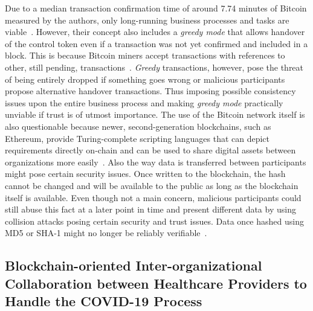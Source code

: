 Due to a median transaction confirmation time of around 7.74 minutes of Bitcoin measured by the authors, only long-running business processes and tasks are viable~\cite{runtime_verification_for_bp_utilizing_bitcoin}. However, their concept also includes a \textit{greedy mode} that allows handover of the control token even if a transaction was not yet confirmed and included in a block. This is because Bitcoin miners accept transactions with references to other, still pending, transactions~\cite{nakamoto2009}. \textit{Greedy} transactions, however, pose the threat of being entirely dropped if something goes wrong or malicious participants propose alternative handover transactions. Thus imposing possible consistency issues upon the entire business process and making \textit{greedy mode} practically unviable if trust is of utmost importance. The use of the Bitcoin network itself is also questionable because newer, second-generation blockchains, such as Ethereum, provide Turing-complete scripting languages that can depict requirements directly on-chain and can be used to share digital assets between organizations more easily~\cite{bo_collaboration_between_healthcare_providers_covid_19,buterin2020,ethereum_yellow_paper}. Also the way data is transferred between participants might pose certain security issues. Once written to the blockchain, the hash cannot be changed and will be available to the public as long as the blockchain itself is available. Even though not a main concern, malicious participants could still abuse this fact at a later point in time and present different data by using collision attacks posing certain security and trust issues. Data once hashed using MD5 or SHA-1 might no longer be reliably verifiable~\cite{new_collision_attack_on_md5,first_collision_for_full_sha_1}.


\subsection{Blockchain-oriented Inter-organizational Collaboration between Healthcare Providers to Handle the COVID-19 Process~\cite{bo_collaboration_between_healthcare_providers_covid_19}}

